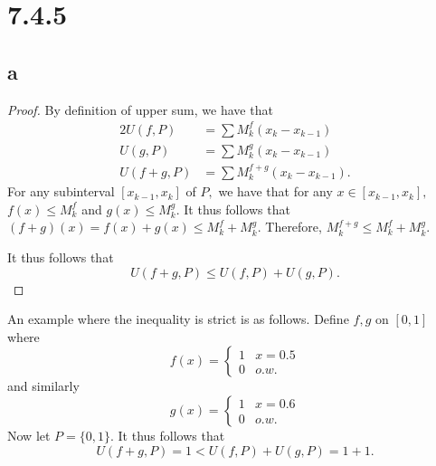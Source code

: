 \documentclass[10pt]{article}
\begin{document}
\section*{7.4.5}

\subsection*{a}

\begin{proof}
    By definition of upper sum, we have that
    \begin{alignat*}{2}
        U(f,P) &= \sum M^f_k (x_k-x_{k-1})\\
        U(g,P) &= \sum M^g_k (x_k-x_{k-1})\\
        U(f+g,P) &= \sum M^{f+g}_k (x_k-x_{k-1}).
    \end{alignat*}
    For any subinterval $[x_{k-1},x_k]$ of $P,$ we have that for any $x\in[x_{k-1},x_k],$ $f(x)\le M^f_k$ and $g(x)\le M^g_k.$ It thus follows that $(f+g)(x)=f(x)+g(x)\le M^f_k+M^g_k.$ Therefore, $M^{f+g}_k\le  M^f_k+M^g_k.$

    It thus follows that\begin{equation*}
        U(f+g,P)\le U(f,P)+U(g,P).
    \end{equation*}
\end{proof}

An example where the inequality is strict is as follows. Define $f,g$ on $[0,1]$ where
\begin{equation*}
    f(x)=\begin{cases}
        1 & x= 0.5\\
        0 & o.w.
    \end{cases}
\end{equation*}
and similarly
\begin{equation*}
    g(x)=\begin{cases}
        1 & x= 0.6\\
        0 & o.w.
    \end{cases}
\end{equation*}
Now let $P = \{0,1\}.$ It thus follows that
\begin{equation*}
    U(f+g,P)= 1 < U(f,P)+U(g,P) = 1+1.
\end{equation*}
\end{document}
